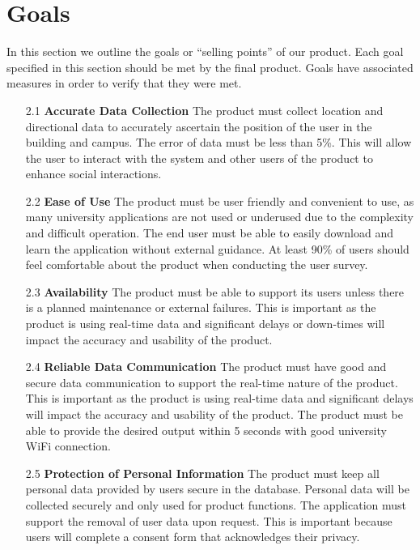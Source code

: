 \documentclass{article}
\begin{document}
\section{Goals}

In this section we outline the goals or ``selling points'' of our product. Each goal specified in this section should be met by the final product. Goals have associated measures in order to verify that they were met.

\begin{itemize}
    \item[2.1] \textbf{Accurate Data Collection} The product must collect location and directional data to accurately ascertain the position of the user in the building and campus. The error of data must be less than 5\%. This will allow the user to interact with the system and other users of the product to enhance social interactions. 

    \item[2.2] \textbf{Ease of Use} The product must be user friendly and convenient to use, as many university applications are not used or underused due to the complexity and difficult operation. The end user must be able to easily download and learn the application without external guidance. At least 90\% of users should feel comfortable about the product when conducting the user survey.

    \item[2.3] \textbf{Availability} The product must be able to support its users unless there is a planned maintenance or external failures. This is important as the product is using real-time data and significant delays or down-times will impact the accuracy and usability of the product.

    \item[2.4] \textbf{Reliable Data Communication} The product must have good and secure data communication to support the real-time nature of the product. This is important as the product is using real-time data and significant delays will impact the accuracy and usability of the product. The product must be able to provide the desired output within 5 seconds with good university WiFi connection.

    \item[2.5] \textbf{Protection of Personal Information} The product must keep all personal data provided by users secure in the database. Personal data will be collected securely and only used for product functions. The application must support the removal of user data upon request. This is important because users will complete a consent form that acknowledges their privacy.


\end{itemize}
\end{document}
